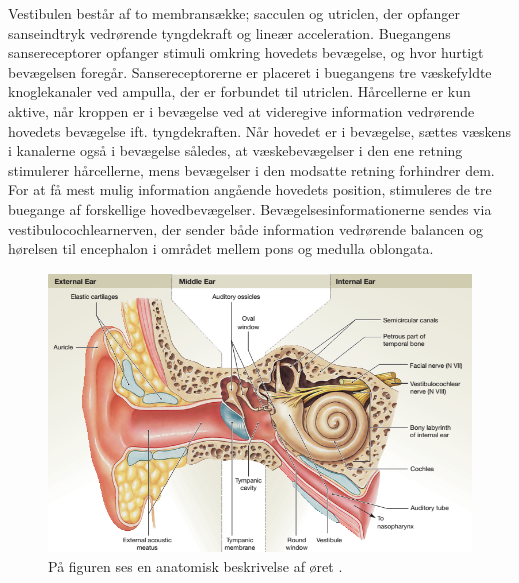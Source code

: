 Vestibulen består af to membransække; sacculen og utriclen, der opfanger sanseindtryk vedrørende tyngdekraft og lineær acceleration. Buegangens sansereceptorer opfanger stimuli omkring hovedets bevægelse, og hvor hurtigt bevægelsen foregår. Sansereceptorerne er placeret i buegangens tre væskefyldte knoglekanaler ved ampulla, der er forbundet til utriclen. Hårcellerne er kun aktive, når kroppen er i bevægelse ved at videregive information vedrørende hovedets bevægelse ift. tyngdekraften. Når hovedet er i bevægelse, sættes væskens i kanalerne også i bevægelse således, at væskebevægelser i den ene retning stimulerer hårcellerne, mens bevægelser i den modsatte retning forhindrer dem. For at få mest mulig information angående hovedets position, stimuleres de tre buegange af forskellige hovedbevægelser. Bevægelsesinformationerne sendes via vestibulocochlearnerven, der sender både information vedrørende balancen og hørelsen til encephalon i området mellem pons og medulla oblongata. \cite{Martini2012}    

\begin{figure}[H]
	\centering
	\includegraphics[scale=0.75]{figures/bProblemanalyse/Oerets-anatomi.jpg}
	\caption{På figuren ses en anatomisk beskrivelse af øret \cite{Martini2012}.}
	\label{Oeret}
\end{figure}

